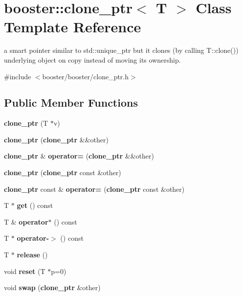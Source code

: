 \section{booster\+:\+:clone\+\_\+ptr$<$ T $>$ Class Template Reference}
\label{classbooster_1_1clone__ptr}


a smart pointer similar to std\+::unique\+\_\+ptr but it clones (by calling T\+::clone()) underlying object on copy instead of moving its ownership.  




{\ttfamily \#include $<$booster/booster/clone\+\_\+ptr.\+h$>$}

\subsection*{Public Member Functions}
\begin{DoxyCompactItemize}
\item 
{\bfseries clone\+\_\+ptr} (T $\ast$v)\label{classbooster_1_1clone__ptr_a25bbc5298997ae57cd05fe4c004ed974}

\item 
{\bfseries clone\+\_\+ptr} ({\bf clone\+\_\+ptr} \&\&other)\label{classbooster_1_1clone__ptr_a8b5d32a7b84efda3469a7f0fa281de54}

\item 
{\bf clone\+\_\+ptr} \& {\bfseries operator=} ({\bf clone\+\_\+ptr} \&\&other)\label{classbooster_1_1clone__ptr_af09ecb313352013a56992d4cee925abd}

\item 
{\bfseries clone\+\_\+ptr} ({\bf clone\+\_\+ptr} const \&other)\label{classbooster_1_1clone__ptr_a5e3b4ce855dc0b77f57879804230bbd5}

\item 
{\bf clone\+\_\+ptr} const \& {\bfseries operator=} ({\bf clone\+\_\+ptr} const \&other)\label{classbooster_1_1clone__ptr_ae7ade5f1b8410f2dfa56970d444d92bc}

\item 
T $\ast$ {\bfseries get} () const \label{classbooster_1_1clone__ptr_a2bc6c2017db9f1290e9fa378188d9d29}

\item 
T \& {\bfseries operator$\ast$} () const \label{classbooster_1_1clone__ptr_aee7534f5dcc06d0a2190c395f2fec2f6}

\item 
T $\ast$ {\bfseries operator-\/$>$} () const \label{classbooster_1_1clone__ptr_aee5a76d527f1901f95fdeb7180d3c6ce}

\item 
T $\ast$ {\bfseries release} ()\label{classbooster_1_1clone__ptr_a17c074b003bfc15b5c89d09b0145bcc6}

\item 
void {\bfseries reset} (T $\ast$p=0)\label{classbooster_1_1clone__ptr_a281dba30ac967d1f69d3ca866a3b66cd}

\item 
void {\bfseries swap} ({\bf clone\+\_\+ptr} \&other)\label{classbooster_1_1clone__ptr_ab0731bd2561a7c6a825b8010656f5e2c}

\end{DoxyCompactItemize}


